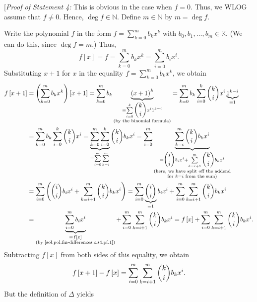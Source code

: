 \documentclass[paper=a4, fontsize=12pt]{scrartcl}%
\let\sumnonlimits\sum
\renewcommand{\sum}{\sumnonlimits\limits}
\theoremstyle{plainsl}
\theoremstyle{definition}
\theoremstyle{remark}
\begin{document}
[\textit{Proof of Statement 4:} This is obvious in the case when $f=0$. Thus,
we WLOG assume that $f\neq0$. Hence, $\deg f\in\mathbb{N}$. Define
$m\in\mathbb{N}$ by $m=\deg f$.

Write the polynomial $f$ in the form $f=\sum_{k=0}^{m}b_{k}x^{k}$ with
$b_{0},b_{1},\ldots,b_{m}\in\mathbb{K}$. (We can do this, since $\deg f=m$.)
Thus,%
\begin{equation}
f\left[  x\right]  =f=\sum_{k=0}^{m}b_{k}x^{k}=\sum_{i=0}^{m}b_{i}x^{i}.
\label{sol.pol.fin-differences.c.s4.pf.1}%
\end{equation}
Substituting $x+1$ for $x$ in the equality $f=\sum_{k=0}^{m}b_{k}x^{k}$, we
obtain%
\begin{align*}
f\left[  x+1\right]   &  =\left(  \sum_{k=0}^{m}b_{k}x^{k}\right)  \left[
x+1\right]  =\sum_{k=0}^{m}b_{k}\underbrace{\left(  x+1\right)  ^{k}%
}_{\substack{=\sum_{i=0}^{k}\dbinom{k}{i}x^{i}1^{k-i}\\\text{(by the binomial
formula)}}}=\sum_{k=0}^{m}b_{k}\sum_{i=0}^{k}\dbinom{k}{i}x^{i}%
\underbrace{1^{k-i}}_{=1}\\
&  =\sum_{k=0}^{m}b_{k}\sum_{i=0}^{k}\dbinom{k}{i}x^{i}=\underbrace{\sum
_{k=0}^{m}\sum_{i=0}^{k}}_{=\sum_{i=0}^{m}\sum_{k=i}^{m}}\dbinom{k}{i}%
b_{k}x^{i}=\sum_{i=0}^{m}\underbrace{\sum_{k=i}^{m}\dbinom{k}{i}b_{k}x^{i}%
}_{\substack{=\dbinom{i}{i}b_{i}x^{i}+\sum_{k=i+1}^{m}\dbinom{k}{i}b_{k}%
x^{i}\\\text{(here, we have split off the addend}\\\text{for }k=i\text{ from
the sum)}}}\\
&  =\sum_{i=0}^{m}\left(  \dbinom{i}{i}b_{i}x^{i}+\sum_{k=i+1}^{m}\dbinom
{k}{i}b_{k}x^{i}\right)  =\sum_{i=0}^{m}\underbrace{\dbinom{i}{i}}_{=1}%
b_{i}x^{i}+\sum_{i=0}^{m}\sum_{k=i+1}^{m}\dbinom{k}{i}b_{k}x^{i}\\
&  =\underbrace{\sum_{i=0}^{m}b_{i}x^{i}}_{\substack{=f\left[  x\right]
\\\text{(by \eqref{sol.pol.fin-differences.c.s4.pf.1})}}}+\sum_{i=0}^{m}%
\sum_{k=i+1}^{m}\dbinom{k}{i}b_{k}x^{i}=f\left[  x\right]  +\sum_{i=0}^{m}%
\sum_{k=i+1}^{m}\dbinom{k}{i}b_{k}x^{i}.
\end{align*}
Subtracting $f\left[  x\right]  $ from both sides of this equality, we obtain%
\begin{equation}
f\left[  x+1\right]  -f\left[  x\right]  =\sum_{i=0}^{m}\sum_{k=i+1}%
^{m}\dbinom{k}{i}b_{k}x^{i}. \label{sol.pol.fin-differences.c.s4.pf.2}%
\end{equation}
But the definition of $\Delta$ yields%
\end{document}
